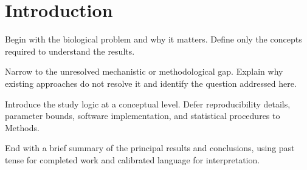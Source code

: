 \section*{Introduction}

Begin with the biological problem and why it matters. Define only the concepts required to understand the results.

Narrow to the unresolved mechanistic or methodological gap. Explain why existing approaches do not resolve it and identify the question addressed here.

Introduce the study logic at a conceptual level. Defer reproducibility details, parameter bounds, software implementation, and statistical procedures to Methods.

End with a brief summary of the principal results and conclusions, using past tense for completed work and calibrated language for interpretation.

